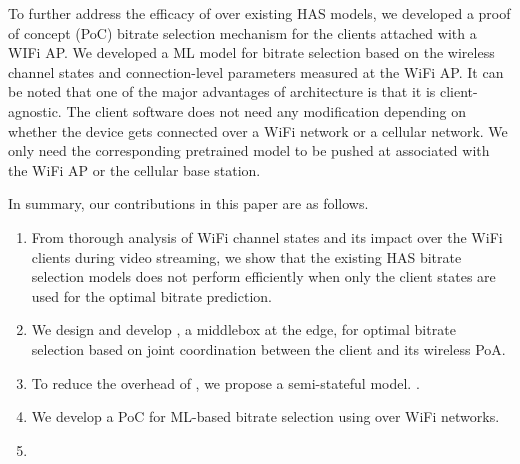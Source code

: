 To further address the efficacy of {\bel} over existing HAS models, we developed a proof of concept (PoC) bitrate selection mechanism for the clients attached with a WIFi AP. We developed a ML model for bitrate selection based on the wireless channel states and connection-level parameters measured at the WiFi AP. It can be noted that one of the major advantages of {\bel} architecture is that it is client-agnostic. The client software does not need any modification depending on whether the device gets connected over a WiFi network or a cellular network. We only need the corresponding pretrained model to be pushed at {\servname} associated with the WiFi AP or the cellular base station.   


In summary, our contributions in this paper are as follows. 
\begin{enumerate}
    \item From thorough analysis of WiFi channel states and its impact over the WiFi clients during video streaming, we show that the existing HAS bitrate selection models does not perform efficiently when only the client states are used for the optimal bitrate prediction. 
    \item We design and develop {\bel}, a middlebox at the edge, for optimal bitrate selection based on joint coordination between the client and its wireless PoA. 
    \item To reduce the overhead of {\bel}, we propose a semi-stateful model. . 
    \item We develop a PoC for ML-based bitrate selection using {\bel} over WiFi networks.  
    \item {}
\end{enumerate}




